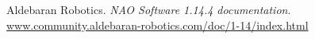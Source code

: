 \begin{thebibliography}{99999}
\singlespace\normalsize














		Aldebaran Robotics.
		\emph{NAO Software 1.14.4 documentation}.
		 \url{www.community.aldebaran-robotics.com/doc/1-14/index.html}


\end{thebibliography}
